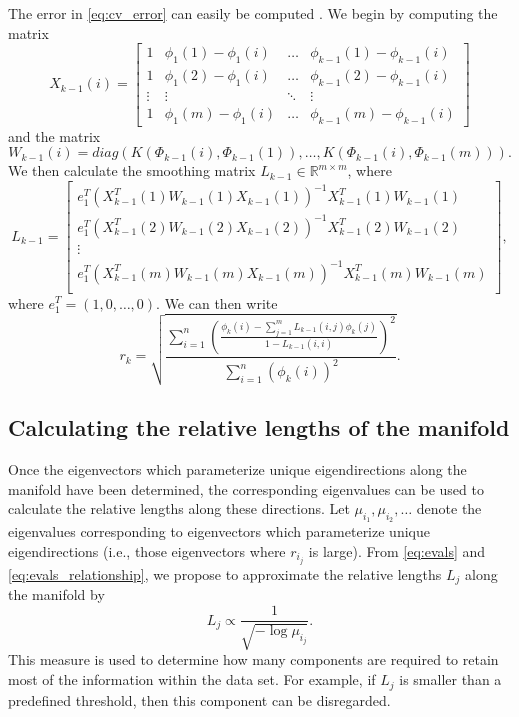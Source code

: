 \documentclass[preprint]{elsarticle}
\begin{document}
The error in \eqref{eq:cv_error} can easily be computed \cite{wasserman2006all}.
%
We begin by computing the matrix
\begin{equation}
X_{k-1}(i) = \begin{bmatrix}
1 & \phi_1(1) - \phi_1(i) & \dots & \phi_{k-1}(1)- \phi_{k-1}(i) \\
1 & \phi_1(2) - \phi_1(i) & \dots & \phi_{k-1}(2)- \phi_{k-1}(i) \\
\vdots & \vdots & \ddots & \vdots \\
1 & \phi_1(m) - \phi_1(i) & \dots & \phi_{k-1}(m)- \phi_{k-1}(i) 
\end{bmatrix}
\end{equation}
%
and the matrix 
\begin{equation}
W_{k-1}(i) = diag \left( K(\Phi_{k-1}(i), \Phi_{k-1}(1)), \dots, K(\Phi_{k-1}(i), \Phi_{k-1}(m)) \right).
\end{equation}
%
We then calculate the smoothing matrix $L_{k-1} \in \mathbb{R}^{m \times m}$, where 
\begin{equation}
L_{k-1} =
\begin{bmatrix}
e_1^T \left( X_{k-1}^T(1) W_{k-1}(1) X_{k-1}(1) \right) ^{-1} X_{k-1}^T(1) W_{k-1}(1) \\
e_1^T \left( X_{k-1}^T(2) W_{k-1}(2) X_{k-1}(2) \right) ^{-1} X_{k-1}^T(2) W_{k-1}(2) \\
\vdots \\
e_1^T \left( X_{k-1}^T(m) W_{k-1}(m) X_{k-1}(m) \right) ^{-1} X_{k-1}^T(m) W_{k-1}(m) \\
\end{bmatrix},
\end{equation}
%
where $e_1^T = (1, 0, \dots, 0)$. 
%
We can then write
%
\begin{equation} 
r_{k} = \sqrt{ \frac{\sum_{i=1}^n \left( \frac{ \phi_{k} (i) - \sum_{j=1}^m L_{k-1}(i,j) \phi_{k}(j) }{1-L_{k-1}(i,i)} \right)^2} {\sum_{i=1}^n  \left( \phi_{k} (i) \right)^2 }} .
\end{equation}

\subsection{Calculating the relative lengths of the manifold} \label{sec:relative_lengths}

Once the eigenvectors which parameterize unique eigendirections along the manifold have been determined, the corresponding eigenvalues can be used to calculate the relative lengths along these directions. 
%
Let $\mu_{i_1}, \mu_{i_2}, \dots$ denote the eigenvalues corresponding to eigenvectors which parameterize unique eigendirections (i.e., those eigenvectors where $r_{i_j}$ is large). 
%
From \eqref{eq:evals} and \eqref{eq:evals_relationship}, we propose to approximate the relative lengths $L_j$  along the manifold by
\begin{equation} \label{eq:est_lengths}
L_j \propto \frac{1}{\sqrt{-\log \mu_{i_j}}}.
\end{equation}
%
This measure is used to determine how many components are required to retain most of the information within the data set.
%
For example, if $L_j$ is smaller than a predefined threshold, then this component can be disregarded. 
\end{document}

